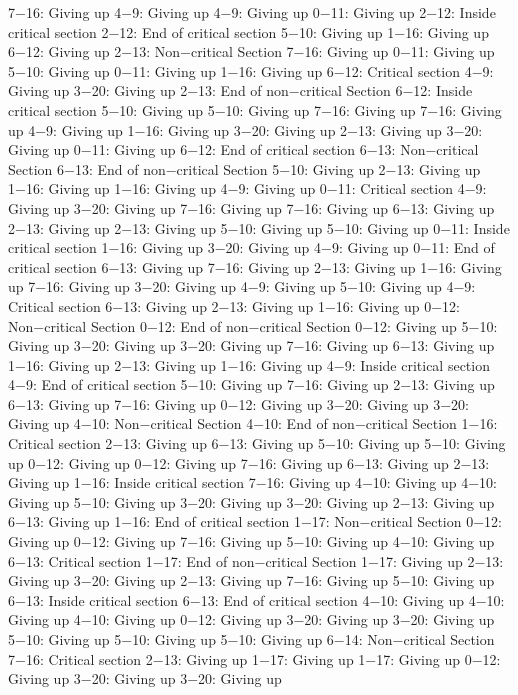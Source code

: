 7−16: Giving up
4−9: Giving up
4−9: Giving up
0−11: Giving up
2−12: Inside critical section
2−12: End of critical section
5−10: Giving up
1−16: Giving up
6−12: Giving up
2−13: Non−critical Section
7−16: Giving up
0−11: Giving up
5−10: Giving up
0−11: Giving up
1−16: Giving up
6−12: Critical section
4−9: Giving up
3−20: Giving up
2−13: End of non−critical Section
6−12: Inside critical section
5−10: Giving up
5−10: Giving up
7−16: Giving up
7−16: Giving up
4−9: Giving up
1−16: Giving up
3−20: Giving up
2−13: Giving up
3−20: Giving up
0−11: Giving up
6−12: End of critical section
6−13: Non−critical Section
6−13: End of non−critical Section
5−10: Giving up
2−13: Giving up
1−16: Giving up
1−16: Giving up
4−9: Giving up
0−11: Critical section
4−9: Giving up
3−20: Giving up
7−16: Giving up
7−16: Giving up
6−13: Giving up
2−13: Giving up
2−13: Giving up
5−10: Giving up
5−10: Giving up
0−11: Inside critical section
1−16: Giving up
3−20: Giving up
4−9: Giving up
0−11: End of critical section
6−13: Giving up
7−16: Giving up
2−13: Giving up
1−16: Giving up
7−16: Giving up
3−20: Giving up
4−9: Giving up
5−10: Giving up
4−9: Critical section
6−13: Giving up
2−13: Giving up
1−16: Giving up
0−12: Non−critical Section
0−12: End of non−critical Section
0−12: Giving up
5−10: Giving up
3−20: Giving up
3−20: Giving up
7−16: Giving up
6−13: Giving up
1−16: Giving up
2−13: Giving up
1−16: Giving up
4−9: Inside critical section
4−9: End of critical section
5−10: Giving up
7−16: Giving up
2−13: Giving up
6−13: Giving up
7−16: Giving up
0−12: Giving up
3−20: Giving up
3−20: Giving up
4−10: Non−critical Section
4−10: End of non−critical Section
1−16: Critical section
2−13: Giving up
6−13: Giving up
5−10: Giving up
5−10: Giving up
0−12: Giving up
0−12: Giving up
7−16: Giving up
6−13: Giving up
2−13: Giving up
1−16: Inside critical section
7−16: Giving up
4−10: Giving up
4−10: Giving up
5−10: Giving up
3−20: Giving up
3−20: Giving up
2−13: Giving up
6−13: Giving up
1−16: End of critical section
1−17: Non−critical Section
0−12: Giving up
0−12: Giving up
7−16: Giving up
5−10: Giving up
4−10: Giving up
6−13: Critical section
1−17: End of non−critical Section
1−17: Giving up
2−13: Giving up
3−20: Giving up
2−13: Giving up
7−16: Giving up
5−10: Giving up
6−13: Inside critical section
6−13: End of critical section
4−10: Giving up
4−10: Giving up
4−10: Giving up
0−12: Giving up
3−20: Giving up
3−20: Giving up
5−10: Giving up
5−10: Giving up
5−10: Giving up
6−14: Non−critical Section
7−16: Critical section
2−13: Giving up
1−17: Giving up
1−17: Giving up
0−12: Giving up
3−20: Giving up
3−20: Giving up
